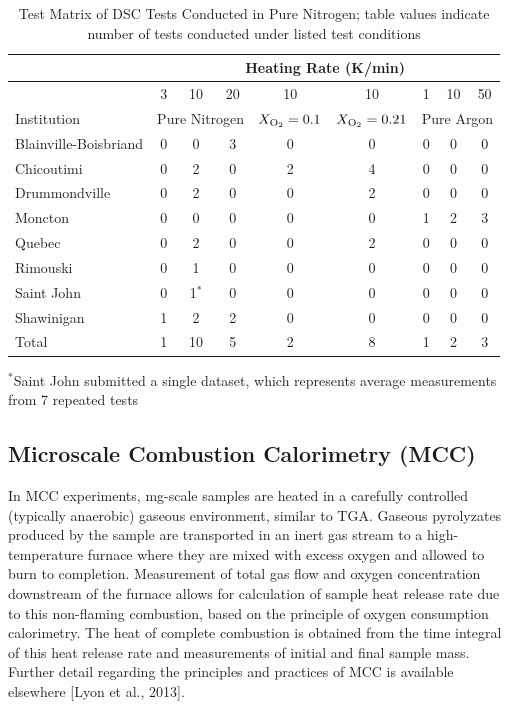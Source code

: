 \documentclass{book}
\begin{document}
\begin{table}
\caption{Test Matrix of DSC Tests Conducted in Pure Nitrogen; table values indicate number of tests conducted under listed test conditions}
\label{Table_5}
\begin{center}
\begin{tabular}{lcccccccc}
                      & \multicolumn{8}{c}{Heating Rate (K/min)} \\ \hline
                      & 3 & 10 & 20 & 10 & 10 & 1  & 10 & 50 \\ \hline
Institution           & \multicolumn{3}{c}{Pure Nitrogen} & $X_{\rm O_2}=0.1$ & $X_{\rm O_2}=0.21$ & \multicolumn{3}{c}{Pure Argon}  \\ \hline
Blainville-Boisbriand & 0 & 0     &     3 & 0 & 0 & 0 & 0 & 0 \\
Chicoutimi            & 0 & 2     &     0 & 2 & 4 & 0 & 0 & 0 \\
Drummondville         & 0 & 2     &     0 & 0 & 2 & 0 & 0 & 0 \\
Moncton               & 0 & 0     &     0 & 0 & 0 & 1 & 2 & 3 \\
Quebec                & 0 & 2     &     0 & 0 & 2 & 0 & 0 & 0 \\
Rimouski              & 0 & 1     &     0 & 0 & 0 & 0 & 0 & 0 \\
Saint John            & 0 & 1$^*$ &     0 & 0 & 0 & 0 & 0 & 0 \\
Shawinigan            & 1 & 2     &     2 & 0 & 0 & 0 & 0 & 0 \\ \hline
Total                 & 1 & 10    &     5 & 2 & 8 & 1 & 2 & 3 \\ \hline
\end{tabular}
\end{center}
$^*$Saint John submitted a single dataset, which represents average measurements from 7 repeated tests
\end{table}

\subsection{Microscale Combustion Calorimetry (MCC)}

In MCC experiments, mg-scale samples are heated in a carefully controlled (typically anaerobic) gaseous environment, similar to TGA. Gaseous pyrolyzates produced by the sample are transported in an inert gas stream to a high-temperature furnace where they are mixed with excess oxygen and allowed to burn to completion. Measurement of total gas flow and oxygen concentration downstream of the furnace allows for calculation of sample heat release rate due to this non-flaming combustion, based on the principle of oxygen consumption calorimetry. The heat of complete combustion is obtained from the time integral of this heat release rate and measurements of initial and final sample mass. Further detail regarding the principles and practices of MCC is available elsewhere [Lyon et al., 2013].
\end{document}
